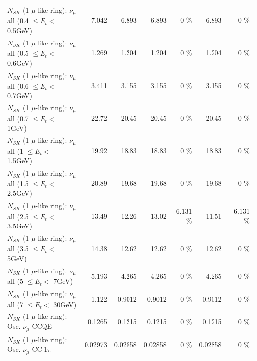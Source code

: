 \begin{table}
\begin{tabular}{| l | r | r | r  r | r  r |}
       $N_{SK}$ (1 $\mu$-like ring): $\nu_{\mu}$ all (0.4 $\leq E_{t} <$ 0.5GeV) &           7.042 &           6.893 &           6.893 &        0 \%  &           6.893 &        0 \%  \\ 
       $N_{SK}$ (1 $\mu$-like ring): $\nu_{\mu}$ all (0.5 $\leq E_{t} <$ 0.6GeV) &           1.269 &           1.204 &           1.204 &        0 \%  &           1.204 &        0 \%  \\ 
       $N_{SK}$ (1 $\mu$-like ring): $\nu_{\mu}$ all (0.6 $\leq E_{t} <$ 0.7GeV) &           3.411 &           3.155 &           3.155 &        0 \%  &           3.155 &        0 \%  \\ 
         $N_{SK}$ (1 $\mu$-like ring): $\nu_{\mu}$ all (0.7 $\leq E_{t} <$ 1GeV) &           22.72 &           20.45 &           20.45 &        0 \%  &           20.45 &        0 \%  \\ 
         $N_{SK}$ (1 $\mu$-like ring): $\nu_{\mu}$ all (1 $\leq E_{t} <$ 1.5GeV) &           19.92 &           18.83 &           18.83 &        0 \%  &           18.83 &        0 \%  \\ 
       $N_{SK}$ (1 $\mu$-like ring): $\nu_{\mu}$ all (1.5 $\leq E_{t} <$ 2.5GeV) &           20.89 &           19.68 &           19.68 &        0 \%  &           19.68 &        0 \%  \\ 
       $N_{SK}$ (1 $\mu$-like ring): $\nu_{\mu}$ all (2.5 $\leq E_{t} <$ 3.5GeV) &           13.49 &           12.26 &           13.02 &    6.131 \%  &           11.51 &   -6.131 \%  \\ 
         $N_{SK}$ (1 $\mu$-like ring): $\nu_{\mu}$ all (3.5 $\leq E_{t} <$ 5GeV) &           14.38 &           12.62 &           12.62 &        0 \%  &           12.62 &        0 \%  \\ 
           $N_{SK}$ (1 $\mu$-like ring): $\nu_{\mu}$ all (5 $\leq E_{t} <$ 7GeV) &           5.193 &           4.265 &           4.265 &        0 \%  &           4.265 &        0 \%  \\ 
          $N_{SK}$ (1 $\mu$-like ring): $\nu_{\mu}$ all (7 $\leq E_{t} <$ 30GeV) &           1.122 &          0.9012 &          0.9012 &        0 \%  &          0.9012 &        0 \%  \\ 
\hline
\hline
                               $N_{SK}$ (1 $\mu$-like ring): Osc. $\nu_\mu$ CCQE &          0.1265 &          0.1215 &          0.1215 &        0 \%  &          0.1215 &        0 \%  \\ 
                          $N_{SK}$ (1 $\mu$-like ring): Osc. $\nu_\mu$ CC 1$\pi$ &         0.02973 &         0.02858 &         0.02858 &        0 \%  &         0.02858 &        0 \%  \\ 

\end{tabular}
\end{table}
